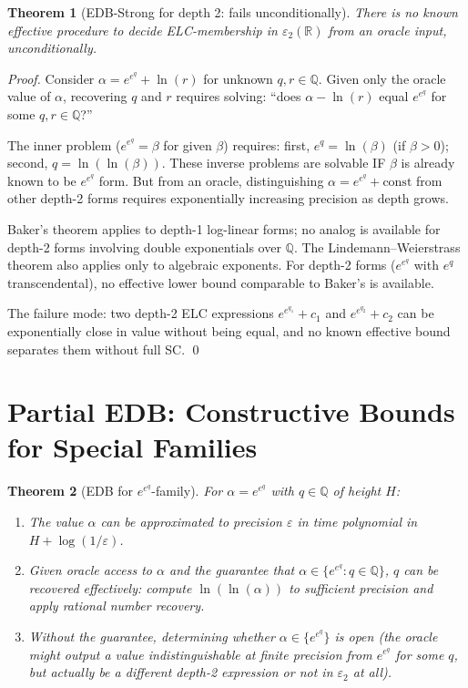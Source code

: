 \documentclass[11pt]{article}
\newtheorem{theorem}{Theorem}
\begin{document}
\begin{theorem}[EDB-Strong for depth 2: fails unconditionally]
\label{thm:edb_depth2_fails}
There is no known effective procedure to decide ELC-membership in $\varepsilon_2(\mathbb{R})$
from an oracle input, unconditionally.
\end{theorem}

\begin{proof}
Consider $\alpha = e^{e^q} + \ln(r)$ for unknown $q, r \in \mathbb{Q}$.
Given only the oracle value of $\alpha$, recovering $q$ and $r$ requires solving:
``does $\alpha - \ln(r)$ equal $e^{e^q}$ for some $q, r \in \mathbb{Q}$?''

The inner problem ($e^{e^q} = \beta$ for given $\beta$) requires:
first, $e^q = \ln(\beta)$ (if $\beta > 0$); second, $q = \ln(\ln(\beta))$.
These inverse problems are solvable IF $\beta$ is already known to be $e^{e^q}$ form.
But from an oracle, distinguishing $\alpha = e^{e^q} + \text{const}$ from other depth-2
forms requires exponentially increasing precision as depth grows.

Baker's theorem applies to depth-1 log-linear forms; no analog is available for
depth-2 forms involving double exponentials over $\mathbb{Q}$.
The Lindemann--Weierstrass theorem also applies only to algebraic exponents.
For depth-2 forms ($e^{e^q}$ with $e^q$ transcendental), no effective lower bound
comparable to Baker's is available.

The failure mode: two depth-2 ELC expressions $e^{e^{q_1}} + c_1$ and $e^{e^{q_2}} + c_2$
can be exponentially close in value without being equal, and no known effective bound
separates them without full SC. \qed
\end{proof}

\section{Partial EDB: Constructive Bounds for Special Families}

\begin{theorem}[EDB for $e^{e^q}$-family]
\label{thm:edb_double_exp}
For $\alpha = e^{e^q}$ with $q \in \mathbb{Q}$ of height $H$:
\begin{enumerate}
  \item The value $\alpha$ can be approximated to precision $\varepsilon$ in time
    polynomial in $H + \log(1/\varepsilon)$.
  \item Given oracle access to $\alpha$ and the guarantee that $\alpha \in \{e^{e^q} : q \in \mathbb{Q}\}$,
    $q$ can be recovered effectively: compute $\ln(\ln(\alpha))$ to sufficient precision
    and apply rational number recovery.
  \item Without the guarantee, determining whether $\alpha \in \{e^{e^q}\}$ is open
    (the oracle might output a value indistinguishable at finite precision from $e^{e^q}$
    for some $q$, but actually be a different depth-2 expression or not in $\varepsilon_2$ at all).
\end{enumerate}
\end{theorem}
\end{document}
